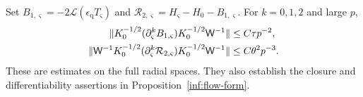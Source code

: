 \begin{lemma}\label{inf:flow-relative}
Set $B_{1,\varsigma}=-2\mathcal L(\epsilon_{\mathrm q}T_\varsigma)$ and
$\mathcal R_{2,\varsigma}=H_\varsigma-H_0-B_{1,\varsigma}$. For $k=0,1,2$ and large $p$,
\begin{align}
 \lVert K_0^{-1/2}(\partial_\varsigma^kB_{1,\varsigma})K_0^{-1/2}\mathsf W^{-1}\rVert
 &\le C\tau p^{-2},\label{inf:flow-linear-relative}\\
 \lVert \mathsf W^{-1}K_0^{-1/2}(\partial_\varsigma^k\mathcal R_{2,\varsigma})
               K_0^{-1/2}\mathsf W^{-1}\rVert
 &\le C\theta^2p^{-3}.\label{inf:flow-quadratic-relative}
\end{align}
These are estimates on the full radial spaces. They also establish
the closure and differentiability assertions in
Proposition~\ref{inf:flow-form}.
\end{lemma}
